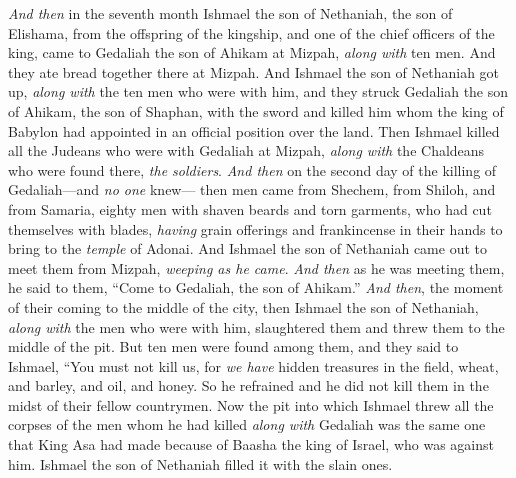 \begin{biblechapter} %
\verse \textit{And then} in the seventh month Ishmael the son of Nethaniah, the son of Elishama, from the offspring of the kingship, and one of the chief officers of the king, came to Gedaliah the son of Ahikam at Mizpah, \textit{along with} ten men. And they ate bread together there at Mizpah.
\verse And Ishmael the son of Nethaniah got up, \textit{along with} the ten men who were with him, and they struck Gedaliah the son of Ahikam, the son of Shaphan, with the sword and killed him whom the king of Babylon had appointed in an official position over the land.
\verse Then Ishmael killed all the Judeans who were with Gedaliah at Mizpah, \textit{along with} the Chaldeans who were found there, \textit{the soldiers}.
 \textit{And then} on the second day of the killing of Gedaliah—and \textit{no one} knew—
\verse then men came from Shechem, from Shiloh, and from Samaria, eighty men with shaven beards and torn garments, who had cut themselves with blades, \textit{having} grain offerings and frankincense in their hands to bring to the \textit{temple} of Adonai.
\verse And Ishmael the son of Nethaniah came out to meet them from Mizpah, \textit{weeping as he came}. \textit{And then} as he was meeting them, he said to them, “Come to Gedaliah, the son of Ahikam.”
\verse \textit{And then}, the moment of their coming to the middle of the city, then Ishmael the son of Nethaniah, \textit{along with} the men who were with him, slaughtered them and threw them to the middle of the pit.
\verse But ten men were found among them, and they said to Ishmael, “You must not kill us, for \textit{we have} hidden treasures in the field, wheat, and barley, and oil, and honey. So he refrained and he did not kill them in the midst of their fellow countrymen.
\verse Now the pit into which Ishmael threw all the corpses of the men whom he had killed \textit{along with} Gedaliah was the same one that King Asa had made because of Baasha the king of Israel, who was against him. Ishmael the son of Nethaniah filled it with the slain ones.

\end{biblechapter}
